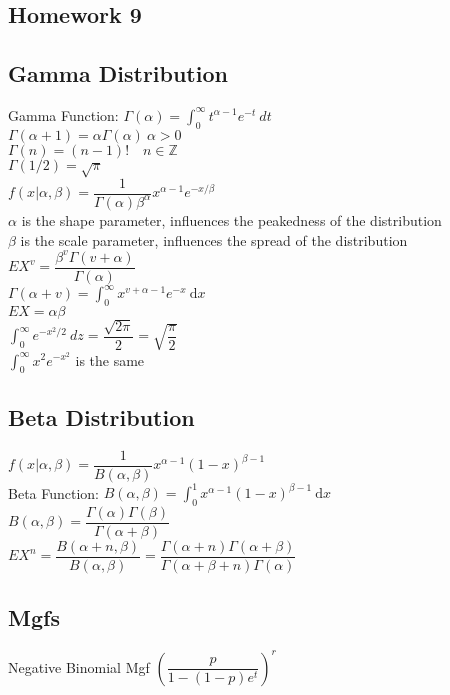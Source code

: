 \documentclass{article}
\newcommand{\dx}{\mathrm{d}x}
\begin{document}
\begin{flushleft}
\section*{Homework 9}
\subsection*{Gamma Distribution}
Gamma Function: $\Gamma(\alpha)=\int_{0}^{\infty}t^{\alpha-1}e^{-t} \ dt$\\
$\Gamma(\alpha+1)=\alpha \Gamma(\alpha) \ \alpha>0$\\
$\Gamma(n)=(n-1)! \quad n \in \mathbb{Z}$\\
$\Gamma(1/2)=\sqrt{\pi}$\\
$f(x|\alpha,\beta)=\dfrac{1}{\Gamma(\alpha) \beta^\alpha}x^{\alpha-1}e^{-x/\beta}$\\
$\alpha$ is the shape parameter, influences the peakedness of the distribution\\
$\beta$ is the scale parameter, influences the spread of the distribution\\
$EX^v=\dfrac{\beta^v \Gamma(v+\alpha)}{\Gamma(\alpha)}$\\
$\Gamma(\alpha+v)=\int_{0}^{\infty}x^{v+\alpha-1}e^{-x} \ \dx$\\
$EX=\alpha \beta$\\
$\int_{0}^{\infty}e^{-x^2/2} \ dz=\dfrac{\sqrt{2\pi}}{2}=\sqrt{\dfrac{\pi}{2}}$\\
$\int_{0}^{\infty}x^2e^{-x^2}$ is the same\\
\subsection*{Beta Distribution}
$f(x|\alpha,\beta)=\dfrac{1}{B(\alpha,\beta)}x^{\alpha-1}(1-x)^{\beta-1}$\\
Beta Function: $B(\alpha,\beta)=\int_{0}^{1}x^{\alpha-1}(1-x)^{\beta-1} \ \dx$ \\ 
$B(\alpha,\beta)=\dfrac{\Gamma(\alpha)\Gamma(\beta)}{\Gamma(\alpha+\beta)}$\\
$EX^n=\dfrac{B(\alpha+n,\beta)}{B(\alpha,\beta)}=\dfrac{\Gamma(\alpha+n)\Gamma(\alpha+\beta)}{\Gamma(\alpha+\beta+n)\Gamma(\alpha)}$\\
\subsection*{Mgfs}
Negative Binomial Mgf $\left(\dfrac{p}{1-(1-p)e^t}\right)^r$\\

\end{flushleft}
\end{document}
